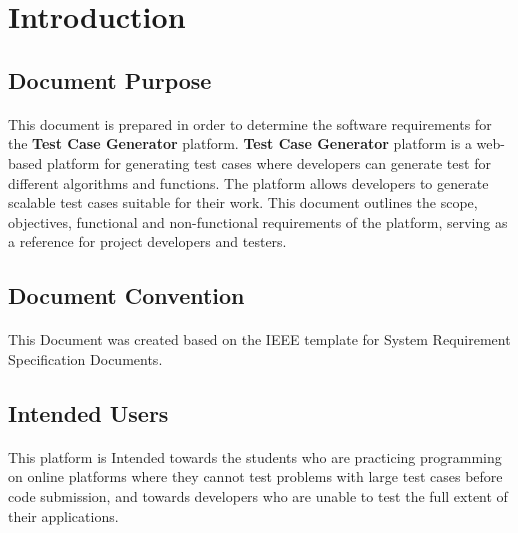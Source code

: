 \documentclass{article}
\begin{document}
\section{Introduction}
\subsection{Document Purpose}
\paragraph{}
This document is prepared in order to determine the software requirements for the
\textbf{Test Case Generator} platform. \textbf{Test Case Generator} platform is a
web-based platform for generating test cases where developers can generate test 
for different algorithms and functions. The platform allows developers to generate
scalable test cases suitable for their work. This document outlines the scope, 
objectives, functional and non-functional requirements of the platform, serving as 
a reference for project developers and testers.

\subsection{Document Convention}
\paragraph{}
This Document was created based on the IEEE template for System Requirement Specification
Documents.

\subsection{Intended Users}
\paragraph{}
This platform is Intended towards the students who are practicing programming on online
platforms where they cannot test problems with large test cases before code submission,
and towards developers who are unable to test the full extent of their applications.
\end{document}

